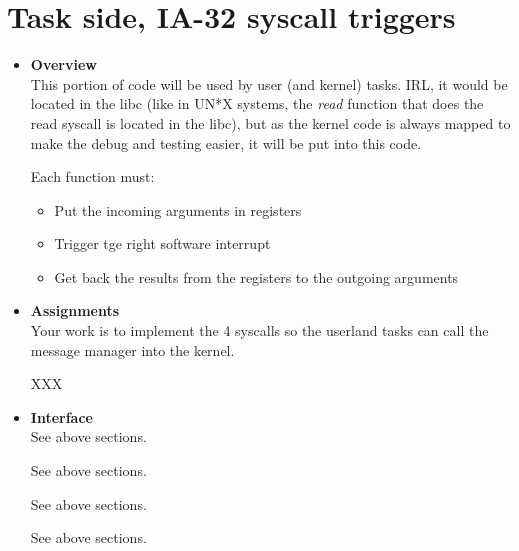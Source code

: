 \section{Task side, \textbf{IA-32 syscall triggers}}
\begin{itemize}
  \item {\bf Overview}\\

    This portion of code will be used by user (and kernel) tasks. IRL,
    it would be located in the libc (like in UN*X systems, the
    \emph{read} function that does the read syscall is located in the
    libc), but as the kernel code is always mapped to make the debug
    and testing easier, it will be put into this code.

    Each function must:

    \begin{itemize}
      \item
	Put the incoming arguments in registers
      \item
	Trigger tge right software interrupt
      \item
	Get back the results from the registers to the outgoing arguments
    \end{itemize}

  \item {\bf Assignments}\\

    Your work is to implement the 4 syscalls so the userland tasks can
    call the message manager into the kernel.

    XXX

  \item {\bf Interface}\\

	 {
	   See above sections.
	 }

	 {
	   See above sections.
	 }

	 {
	   See above sections.
	 }

	 {
	   See above sections.
	 }


\end{itemize}
